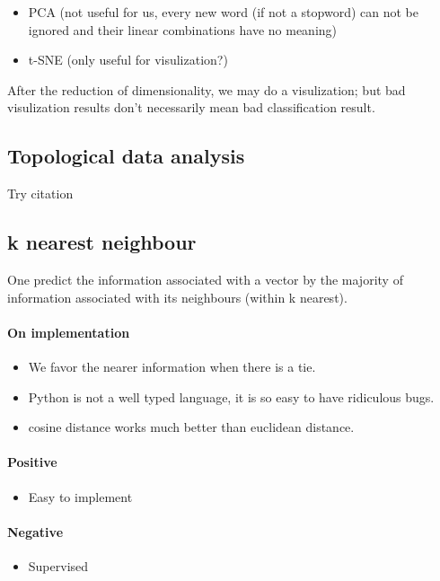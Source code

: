 \documentclass{article}
\begin{document}
\begin{itemize}
  \item PCA (not useful for us, every new word (if not a stopword) can not be ignored and their linear combinations have no meaning)
  \item t-SNE (only useful for visulization?)
\end{itemize}

After the reduction of dimensionality, we may do a visulization; but
bad visulization results don't necessarily mean bad classification result.

\subsection{Topological data analysis}

Try citation \cite{Zhu_2013}

\subsection{k nearest neighbour}

One predict the information associated with a vector by the majority
of information associated with its neighbours (within k nearest).

\paragraph{On implementation} \begin{itemize}
  \item We favor the nearer information when there is a tie.
  \item Python is not a well typed language, it is so easy to have
  ridiculous bugs.
  \item cosine distance works much better than euclidean distance.
\end{itemize}

\paragraph{Positive} \begin{itemize}
  \item Easy to implement
\end{itemize}

\paragraph{Negative} \begin{itemize}
  \item Supervised
\end{itemize}
\end{document}
